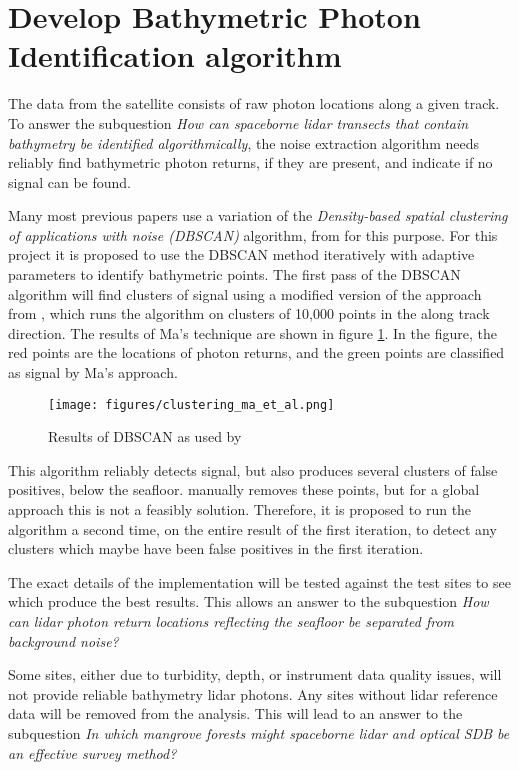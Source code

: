 \section{Develop Bathymetric Photon Identification algorithm}

The data from the satellite consists of raw photon locations along a given track. To answer the subquestion \emph{How can spaceborne lidar transects that contain bathymetry be identified algorithmically}, the noise extraction algorithm needs reliably find bathymetric photon returns, if they are present, and indicate if no signal can be found.

Many most previous papers use a variation of the \emph{Density-based spatial clustering of applications with noise (DBSCAN)} algorithm, from \citeauthor{Ester1996} for this purpose. For this project it is proposed to use the DBSCAN method iteratively with adaptive parameters to identify bathymetric points. The first pass of the DBSCAN algorithm will find clusters of signal using a modified version of the approach from \citeauthor{Ma2020}, which runs the algorithm on clusters of 10,000 points in the along track direction. The results of Ma's technique are shown in figure \ref{fig:dbscan-clustering}. In the figure, the red points are the locations of photon returns, and the green points are classified as signal by Ma's approach.

\begin{figure}[htbp]
      \centering
      \texttt{[image: figures/clustering\_ma\_et\_al.png]}
      \caption{Results of DBSCAN as used by \citeauthor{Ma2020}}
      \label{fig:dbscan-clustering}
\end{figure}

This algorithm reliably detects signal, but also produces several clusters of false positives, below the seafloor. \citeauthor{Ma2020} manually removes these points, but for a global approach this is not a feasibly solution. Therefore, it is proposed to run the algorithm a second time, on the entire result of the first iteration, to detect any clusters which maybe have been false positives in the first iteration.

The exact details of the implementation will be tested against the test sites to see which produce the best results. This allows an answer to the subquestion \emph{How can lidar photon return locations reflecting the seafloor be separated from background noise?}

Some sites, either due to turbidity, depth, or instrument data quality issues, will not provide reliable bathymetry lidar photons. Any sites without lidar reference data will be removed from the analysis. This will lead to an answer to the subquestion \emph{In which mangrove forests might spaceborne lidar and optical SDB be an effective survey method?}

